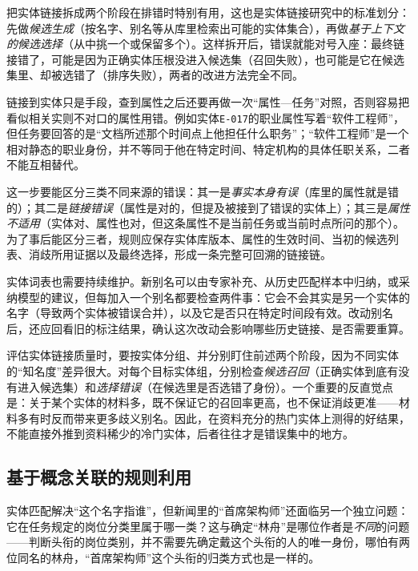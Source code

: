 把实体链接拆成两个阶段在排错时特别有用，这也是实体链接研究中的标准划分：先做\emph{候选生成}（按名字、别名等从库里检索出可能的实体集合），再做\emph{基于上下文的候选选择}（从中挑一个或保留多个）。这样拆开后，错误就能对号入座：最终链接错了，可能是因为正确实体压根没进入候选集（召回失败），也可能是它在候选集里、却被选错了（排序失败），两者的改进方法完全不同。

链接到实体只是手段，查到属性之后还要再做一次“属性—任务”对照，否则容易把看似相关实则不对口的属性用错。例如实体\texttt{E-017}的职业属性写着“软件工程师”，但任务要回答的是“文档所述那个时间点上他担任什么职务”；“软件工程师”是一个相对静态的职业身份，并不等同于他在特定时间、特定机构的具体任职关系，二者不能互相替代。

这一步要能区分三类不同来源的错误：其一是\emph{事实本身有误}（库里的属性就是错的）；其二是\emph{链接错误}（属性是对的，但提及被接到了错误的实体上）；其三是\emph{属性不适用}（实体对、属性也对，但这条属性不是当前任务或当前时点所问的那个）。为了事后能区分三者，规则应保存实体库版本、属性的生效时间、当初的候选列表、消歧所用证据以及最终选择，形成一条完整可回溯的链接链。

实体词表也需要持续维护。新别名可以由专家补充、从历史匹配样本中归纳，或采纳模型的建议，但每加入一个别名都要检查两件事：它会不会其实是另一个实体的名字（导致两个实体被错误合并），以及它是否只在特定时间段有效。改动别名后，还应回看旧的标注结果，确认这次改动会影响哪些历史链接、是否需要重算。

评估实体链接质量时，要按实体分组、并分别盯住前述两个阶段，因为不同实体的“知名度”差异很大。对每个目标实体组，分别检查\emph{候选召回}（正确实体到底有没有进入候选集）和\emph{选择错误}（在候选里是否选错了身份）。一个重要的反直觉点是：关于某个实体的材料多，既不保证它的召回率更高，也不保证消歧更准——材料多有时反而带来更多歧义别名。因此，在资料充分的热门实体上测得的好结果，不能直接外推到资料稀少的冷门实体，后者往往才是错误集中的地方。

\subsection{基于概念关联的规则利用}
\label{sec:rule-based-knowledge-acquisition-concept-association}

实体匹配解决“这个名字指谁”，但新闻里的“首席架构师”还面临另一个独立问题：它在任务规定的岗位分类里属于哪一类？这与确定“林舟”是哪位作者是\emph{不同}的问题——判断头衔的岗位类别，并不需要先确定戴这个头衔的人的唯一身份，哪怕有两位同名的林舟，“首席架构师”这个头衔的归类方式也是一样的。

